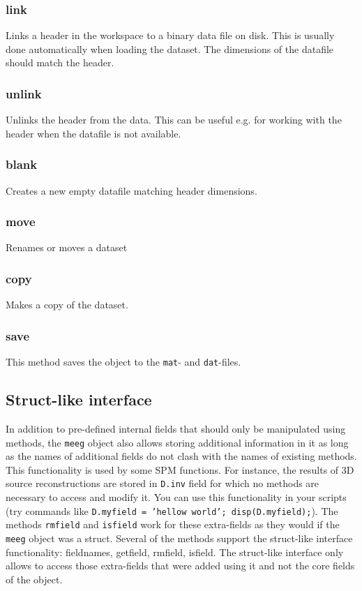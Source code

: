 \subsubsection{link}
Links a header in the workspace to a binary data file on disk. This is usually done automatically when loading the dataset. The dimensions of the datafile should match the header.

\subsubsection{unlink}
Unlinks the header from the data. This can be useful e.g. for working with the header when the datafile is not available.

\subsubsection{blank}
Creates a new empty datafile matching header dimensions.

\subsubsection{move}
Renames or moves a dataset

\subsubsection{copy}
Makes a copy of the dataset.

\subsubsection{save}
This method saves the object to the \texttt{mat}- and \texttt{dat}-files.

\subsection{Struct-like interface}
In addition to pre-defined internal fields that should only be manipulated using methods, the \texttt{meeg} object also allows storing additional information in it as long as the names of additional fields do not clash with the names of existing methods. This functionality is used by some SPM functions. For instance, the results of 3D source reconstructions are stored in \texttt{D.inv} field for which no methods are necessary to access and modify it. You can use this functionality in your scripts (try commands like \texttt{D.myfield = 'hellow world'; disp(D.myfield);}). The methods \texttt{rmfield} and \texttt{isfield} work for these extra-fields as they would if the \texttt{meeg} object was a struct. Several of the methods support the struct-like interface functionality: fieldnames, getfield, rmfield, isfield. The struct-like interface only allows to access those extra-fields that were added using it and not the core fields of the object.

